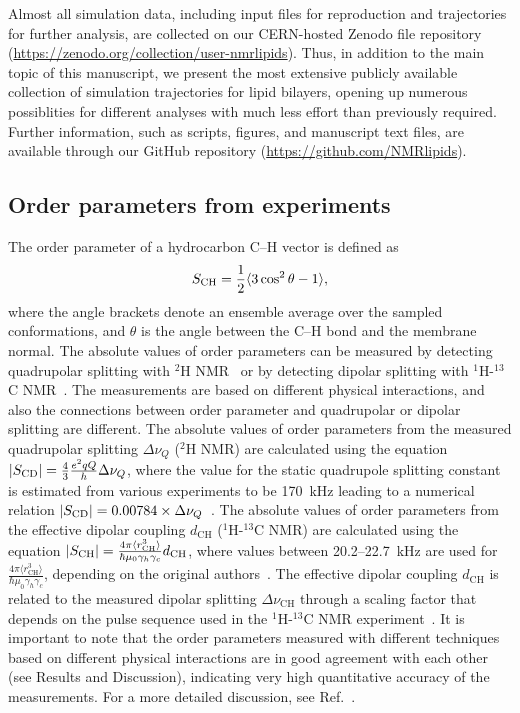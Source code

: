 \documentclass[journal=jacsat,manuscript=article]{achemso}
\begin{document}
Almost all simulation data, including input files for reproduction and trajectories for further analysis, are collected
on our CERN-hosted Zenodo file repository (\url{https://zenodo.org/collection/user-nmrlipids}).
Thus, in addition to the main topic of this manuscript, we present the most extensive publicly available collection of simulation trajectories
for lipid bilayers, opening up numerous possiblities for different analyses with much less effort than previously required.
Further information, such as scripts, figures, and manuscript text files, are available through our GitHub 
repository (\url{https://github.com/NMRlipids}). 


\subsection{Order parameters from experiments}\label{expORDp}
The order parameter of a hydrocarbon C--H vector is defined as 
\begin{equation}\label{orderP}
S_{{\rm CH}}=\frac{1}{2}\langle 3 \cos^2 \theta-1 \rangle,
\end{equation} 
where the angle brackets denote an ensemble average over the sampled conformations, and $\theta$ is the angle between the C--H bond and the membrane normal.
The absolute values of order parameters can be measured by detecting quadrupolar splitting with $^2$H NMR~\cite{seelig77c} or by detecting dipolar 
splitting with $^1$H-$^{13}$C NMR~\cite{hong95a,gross97,dvinskikh05a,ferreira13}. The measurements are based on
different physical interactions, and also the connections between order parameter and quadrupolar or dipolar splitting
are different. The absolute values of order parameters from the measured quadrupolar splitting $\Delta \nu_Q$ ($^2$H NMR) are calculated using 
the equation $|S_{{\rm CD}}|=\frac{4}{3} \frac{e^2qQ}{h} \Delta \nu_Q$, where the value for the static quadrupole
splitting constant is estimated from various experiments to be 170~kHz leading to a numerical relation $|S_{{\rm CD}}|=0.00784 \times \Delta \nu_Q$~\cite{seelig77c}. 
The absolute values of order parameters from the effective dipolar coupling $d_\mathrm{CH}$ ($^1$H-$^{13}$C NMR) are calculated using the equation
$|S_{{\rm CH}}|=\frac{4\pi\langle r_\mathrm{CH}^3 \rangle}{\hbar \mu_0 \gamma_h \gamma_c} d_\mathrm{CH}$, where
values between 20.2--22.7~kHz are used for $\frac{4\pi\langle r_\mathrm{CH}^3 \rangle}{\hbar \mu_0 \gamma_h \gamma_c}$,
depending on the original authors~\cite{hong95a,gross97,dvinskikh05a,ferreira13}.
The effective dipolar coupling $d_\mathrm{CH}$ is related to the measured dipolar splitting $\Delta \nu_\mathrm{CH}$ 
through a scaling factor that depends on the pulse sequence used in the $^1$H-$^{13}$C NMR experiment~\cite{hong95a,gross97,dvinskikh05a,ferreira13}.
It is important to note that the order parameters measured with different techniques based on different physical interactions are in good agreement
with each other (see Results and Discussion), indicating very high quantitative accuracy of the measurements.
For a more detailed discussion, see Ref.~. 
\end{document}
